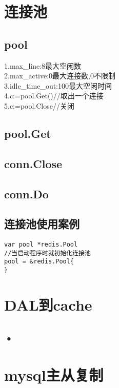 \documentclass[12pt,a4paper,openany,fleqn]{book} %
\begin{document}
  
\tableofcontents

%
\chapter{连接池}
\section{pool}
1.max\_line:8最大空闲数\\
2.max\_active:0最大连接数,0不限制\\
3.idle\_time\_out:100最大空闲时间\\
4.c:=pool.Get()//取出一个连接\\
5.c:=pool.Close//关闭

\section{pool.Get}

\section{conn.Close}

\section{conn.Do}

\section{连接池使用案例}
\begin{lstlisting}
var pool *redis.Pool
//当启动程序时就初始化连接池
pool = &redis.Pool{
}
\end{lstlisting}

%
\chapter{DAL到cache}
\section{•}

%
\chapter{mysql主从复制}
\end{document}
